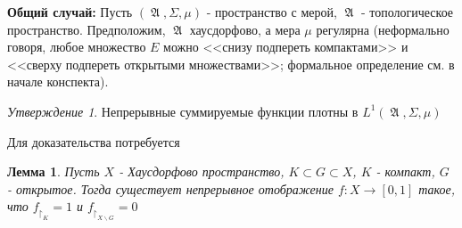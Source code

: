 \documentclass[a4paper]{article}
\theoremstyle{indented}
\newtheorem{lemma}{Лемма}
\theoremstyle{definition}
\theoremstyle{remark}
\newtheorem{stat}{Утверждение}
\DeclareMathOperator{\ra}{\rightarrow}
\DeclareMathOperator{\GA}{\mathfrak{A}}
\begin{document}
\textbf{Общий случай:} Пусть $(\GA, \Sigma, \mu)$ - пространство с мерой, $\GA$ - топологическое пространство. Предположим, $\GA$ хаусдорфово, а мера $\mu$ регулярна (неформально говоря, любое множество $E$ можно <<снизу подпереть компактами>> и <<сверху подпереть открытыми множествами>>; формальное определение см. в начале конспекта). 
\begin{stat}
Непрерывные суммируемые функции плотны в $L^1(\GA, \Sigma, \mu)$
\end{stat}
Для доказательства потребуется
\begin{lemma}
 Пусть $X$ - Хаусдорфово пространство, $K \subset G \subset X$, $K$ - компакт, $G$ - открытое. Тогда существует непрерывное отображение $f: X \ra [0, 1]$ такое, что $f_{\upharpoonright_K}=1$ и $f_{\upharpoonright_{X \backslash G}}=0$
\end{lemma}
\end{document}
